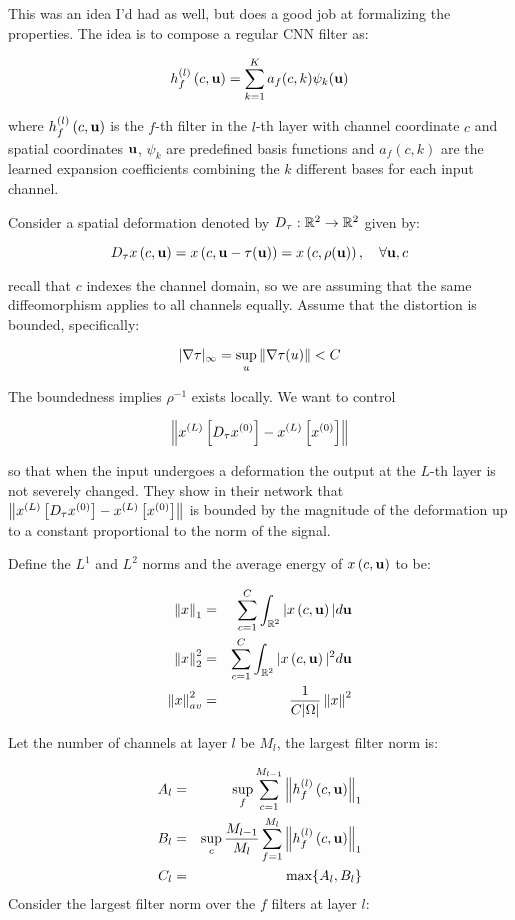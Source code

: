 This was an idea I'd had as well, but \cite{qiu_dcfnet:_2018} does a good job at
formalizing the properties. The idea is to compose a regular CNN filter as: 

$$ \cnnfilt{l}{f}{c}{\xy} = \sum_{k=1}^K a_{f}(c, k) \psi_k (\xy) $$

where $\cnnfilt{l}{f}{c}{\xy}$ is the $f$-th filter in the $l$-th layer with channel
coordinate $c$ and spatial coordinates $\xy$, $\psi_k$ are predefined basis
functions and $a_{f}(c, k)$ are the learned expansion coefficients combining the
$k$ different bases for each input channel.


Consider a spatial deformation denoted by 
$D_\tau : \reals[2] \rightarrow \reals[2]$ given by:

$$D_{\tau} \cnnact{x}{c}{\xy} = \cnnact{x}{c}{\xy - \tau(\xy)} = \cnnact{x}{c}{\rho(\xy)}, \quad \forall \xy, c $$

recall that $c$ indexes the channel domain, so we are assuming that the
same diffeomorphism applies to all channels equally. Assume that the distortion
is bounded, specifically:

$$ |\nabla \tau|_{\infty} = \sup_{u} \norm{\nabla \tau(u) } < C $$

The boundedness implies $\rho^{-1}$ exists locally. We want to control

$$ \norm{ x^{(L)} \left[ D_\tau x^{(0)} \right] - x^{(L)} \left[ x^{(0)} \right]} $$

so that when the input undergoes a deformation the output at the $L$-th layer is
not severely changed. They show in their network that 
$ \norm{ x^{(L)} \left[ D_\tau x^{(0)} \right] - x^{(L)} \left[ x^{(0)} \right]} $
is bounded by the magnitude of the deformation up to a constant proportional to
the norm of the signal.

Define the $L^1$ and $L^2$ norms and the average energy of $\cnnact{x}{c}{\xy}$ to be:

\begin{eqnarray}
  \norm{x}_1 &=& \sum_{c = 1}^{C} \int_{\reals[2]} |\cnnact{x}{c}{\xy}| d\xy \\
  \norm{x}_2^{2} &=& \sum_{c = 1}^{C} \int_{\reals[2]} |\cnnact{x}{c}{\xy}|^2 d\xy  \\
  \norm{x}^2_{av} &=& \frac{1}{C |\Omega|} \norm{x}^2 
\end{eqnarray}

Let the number of channels at layer $l$ be $M_l$, the largest filter norm is:

\begin{eqnarray}
  A_l & = &  \sup_{f} \sum_{c=1}^{M_{l-1}} \norm{ \cnnfilt{l}{f}{c}{\xy} }_1 \\
  B_l & = & \sup_{c} \frac{M_{l-1}}{M_l} \sum_{f=1}^{M_l} \norm{ \cnnfilt{l}{f}{c}{\xy} }_1 \\
  C_l & = & \max \{ A_l, B_l \} 
\end{eqnarray}
Consider the largest filter norm over the $f$ filters at layer $l$:

